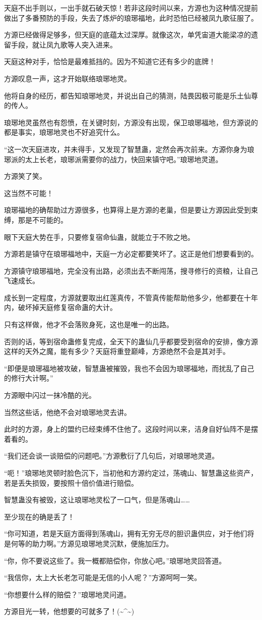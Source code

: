 \begin{this_body}
天庭不出手则以，一出手就石破天惊！若非这段时间以来，方源也为这种情况提前做出了多番预防的手段，失去了炼炉的琅琊福地，此时恐怕已经被凤九歌征服了。

方源已经做得足够多，但天庭的底蕴太过深厚。就像这次，单凭宙道大能梁凉的遗留手段，就让凤九歌等人突入进来。

天庭这种对手，恰恰是最难抵挡的。因为不知道它还有多少的底牌！

方源叹息一声，这才开始联络琅琊地灵。

他将自身的经历，都告知琅琊地灵，并说出自己的猜测，陆畏因极可能是乐土仙尊的传人。

琅琊地灵虽然也有怨愤，在关键时刻，方源没有出现，保卫琅琊福地，但方源说的都是事实，琅琊地灵也不好追究什么。

“这一次天庭进攻，并未得手，又发现了智慧蛊，定然会再次前来。方源你身为琅琊派的太上长老，琅琊派需要你的战力，快回来镇守吧。”琅琊地灵道。

方源笑了笑。

这当然不可能！

琅琊福地的确帮助过方源很多，也算得上是方源的老巢，但是要让方源因此受到束缚，那是不可能的。

眼下天庭大势在手，只要修复宿命仙蛊，就能立于不败之地。

方源若是镇守在琅琊福地中，天庭一方必定都要笑坏了。这正是他们想要看到的。

方源镇守琅琊福地，完全没有出路，必须出去不断闯荡，搜寻修行的资粮，让自己飞速成长。

成长到一定程度，方源就要取出红莲真传，不管真传能帮助他多少，他都要在十年内，破坏掉天庭修复宿命蛊的大计。

只有这样做，他才不会落败身死，这也是唯一的出路。

否则的话，等到宿命蛊修复完成，全天下的蛊仙几乎都要受到宿命的安排，像方源这样的天外之魔，能有多少？天庭将重登巅峰，方源绝然不会是其对手。

“即便是琅琊福地被攻破，智慧蛊被摧毁，我也不会因为琅琊福地，而扰乱了自己的修行大计啊。”

方源眼中闪过一抹冷酷的光。

当然这些话，他绝不会对琅琊地灵去讲。

此时的方源，身上的盟约已经束缚不住他了。这段时间以来，洁身自好仙阵不是摆着看的。

“我们还会谈一谈赔偿的问题吧。”方源敷衍了几句后，对琅琊地灵道。

“呃！”琅琊地灵顿时脸色沉下，当初他和方源约定过，荡魂山、智慧蛊这些资产，若是丢失损毁，要按照十倍价值进行赔偿。

智慧蛊没有被毁，这让琅琊地灵松了一口气，但是荡魂山……

至少现在的确是丢了！

“你可知道，若是天庭方面得到荡魂山，拥有无穷无尽的胆识蛊供应，对于他们将是何等的助力啊。”方源见琅琊地灵沉默，便施加压力。

“你，你不要说这些了。我一概都赔偿你，你放心吧。”琅琊地灵回答道。

“我信你，太上大长老怎可能是无信的小人呢？”方源呵呵一笑。

“你想要什么样的赔偿？”琅琊地灵问道。

方源目光一转，他想要的可就多了！(\~{}\^{}\~{})

\end{this_body}

